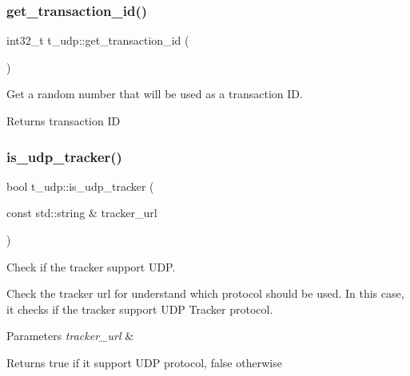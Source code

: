 \subsubsection{\texorpdfstring{get\+\_\+transaction\+\_\+id()}{get\_transaction\_id()}}
{\footnotesize\ttfamily int32\+\_\+t t\+\_\+udp\+::get\+\_\+transaction\+\_\+id (\begin{DoxyParamCaption}{ }\end{DoxyParamCaption})}



Get a random number that will be used as a transaction ID. 

\begin{DoxyReturn}{Returns}
transaction ID 
\end{DoxyReturn}
\mbox{\label{namespacet__udp_af6fbd38370a6f5f7d8520144de7104c4}} 
\subsubsection{\texorpdfstring{is\+\_\+udp\+\_\+tracker()}{is\_udp\_tracker()}}
{\footnotesize\ttfamily bool t\+\_\+udp\+::is\+\_\+udp\+\_\+tracker (\begin{DoxyParamCaption}\item[{const std\+::string \&}]{tracker\+\_\+url }\end{DoxyParamCaption})}



Check if the tracker support U\+DP. 

Check the tracker url for understand which protocol should be used. In this case, it check\textquotesingle{}s if the tracker support U\+DP Tracker protocol.


\begin{DoxyParams}{Parameters}
{\em tracker\+\_\+url} & \\
\hline
\end{DoxyParams}
\begin{DoxyReturn}{Returns}
true if it support U\+DP protocol, false otherwise 
\end{DoxyReturn}
\mbox{\label{namespacet__udp_a1f2a0ab9801cbc55002e67c166895a0e}} 
